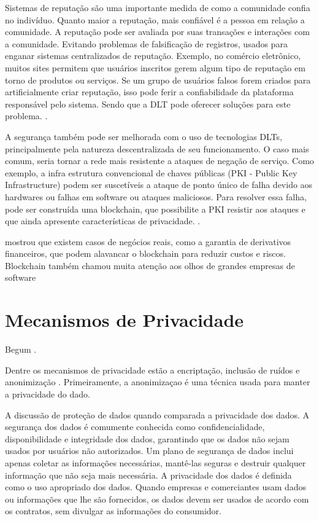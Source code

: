 Sistemas de reputação são uma importante medida de como a comunidade confia no indivíduo. Quanto maior a reputação, mais confiável é a pessoa em relação a comunidade. A reputação pode ser avaliada por suas transações e interações com a comunidade. Evitando problemas de falsificação de registros, usados para enganar sistemas centralizados de reputação. Exemplo, no comércio eletrônico, muitos sites permitem que usuários inscritos gerem algum tipo de reputação em torno de produtos ou serviços. Se um grupo de usuários falsos forem criados para artificialmente criar reputação, isso pode ferir a confiabilidade da plataforma responsável pelo sistema. Sendo que a DLT pode oferecer soluções para este problema. \citep{zheng2018blockchain}.

A segurança também pode ser melhorada com o uso de tecnologias DLTs, principalmente pela natureza descentralizada de seu funcionamento. O caso mais comum, seria tornar a rede mais resistente a ataques de negação de serviço. Como exemplo, a infra estrutura convencional de chaves públicas (PKI - Public Key Infrastructure) podem ser suscetíveis a ataque de ponto único de falha devido aos hardwares ou falhas em software ou ataques maliciosos. Para resolver essa falha, pode ser construída uma blockchain, que possibilite a PKI resistir aos ataques e que ainda apresente características de privacidade. \citep{zheng2018blockchain}.




mostrou que existem casos de negócios reais, como a garantia de derivativos financeiros, que podem alavancar o blockchain para reduzir custos e riscos. Blockchain também chamou muita atenção aos olhos de grandes empresas de software

\chapter{Mecanismos de Privacidade}
Begum \cite{article:BegumSNausheenF2018}.

Dentre os mecanismos de privacidade estão a encriptação, inclusão de ruídos e anonimização \citep{article:BegumSNausheenF2018}. Primeiramente, a anonimizaçao é uma técnica usada para manter a privacidade do dado.

A discussão de proteção de dados quando comparada a privacidade dos dados. A segurança dos dados é comumente conhecida como confidencialidade, disponibilidade e integridade dos dados, garantindo que os dados não sejam usados por usuários não autorizados. Um plano de segurança de dados inclui apenas coletar as informações necessárias, mantê-las seguras e destruir qualquer informação que não seja mais necessária. A privacidade dos dados é definida como o uso apropriado dos dados. Quando empresas e comerciantes usam dados ou informações que lhe são fornecidos, os dados devem ser usados de acordo com os contratos, sem divulgar as informações do consumidor.

